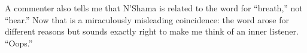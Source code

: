 A commenter also tells me that N'Shama is related to the word for ``breath,'' not ``hear.'' Now that is a miraculously misleading coincidence: the word arose for different reasons but sounds exactly right to make me think of an inner listener. ``Oops.'' 
